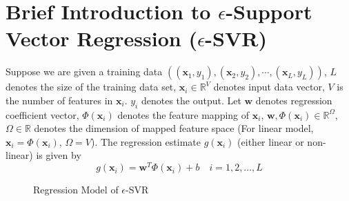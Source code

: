 \section{Brief Introduction to $\epsilon$-Support Vector Regression ($\epsilon$-SVR)}
  Suppose we are given a training data $((\mathbf{x}_{1}, y_{1}),(\mathbf{x}_{2},y_{2}),\cdots,(\mathbf{x}_{L},y_{L}))$, $L$ denotes the size of the training data set, $\mathbf{x}_{i}\in \mathbb{R}^{V}$ denotes input data vector, $V$ is the number of features in $\mathbf{x}_{i}$. $y_{i}$ denotes the output. Let $\mathbf{w}$ denotes regression coefficient vector, $\Phi(\mathbf{x}_{i})$ denotes the feature mapping of $\mathbf{x}_{i}$, $\mathbf{w},\Phi(\mathbf{x}_{i})\in \mathbb{R}^{\Omega}$, $\Omega \in \mathbb{R}$ denotes the dimension of mapped feature space (For linear model, $\mathbf{x}_{i}=\Phi(\mathbf{x}_{i})$, $\Omega=V$). The regression estimate $g(\mathbf{x}_{i})$ (either linear or non-linear) is given by 
\begin{equation}
g(\mathbf{x}_{i})=\mathbf{w}^{T}\Phi(\mathbf{x}_{i})+b  \quad i= 1,2,\ldots, L
\label{regression estimates}
\end{equation} 
\begin{figure}
\centering
\def\svgwidth{\columnwidth}

\caption{Regression Model of $\epsilon$-SVR}
\label{regression model}
\end{figure}

